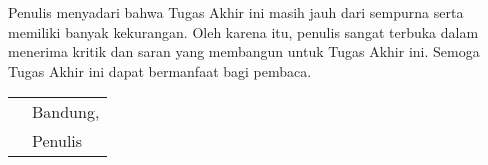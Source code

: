 Penulis menyadari bahwa Tugas Akhir ini masih jauh dari sempurna serta memiliki banyak kekurangan. Oleh karena itu, penulis sangat terbuka dalam menerima kritik dan saran yang membangun untuk Tugas Akhir ini. Semoga Tugas Akhir ini dapat bermanfaat bagi pembaca.

\vspace{15mm}
\begin{tabularx}{\textwidth}{l@{\hskip 0.5\textwidth}l}
	 & Bandung, \thedate{} \yearsidang{} \\
	 & Penulis
\end{tabularx}
